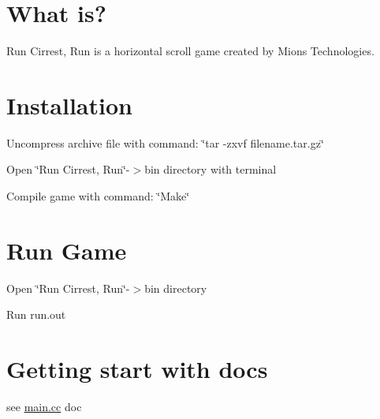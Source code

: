 \hypertarget{index_intro_sec}{}\section{What is?}\label{index_intro_sec}
Run Cirrest, Run is a horizontal scroll game created by Mions Technologies.\hypertarget{index_install_sec}{}\section{Installation}\label{index_install_sec}

\begin{DoxyEnumerate}
\item Uncompress archive file with command\-: \char`\"{}tar -\/zxvf filename.\-tar.\-gz\char`\"{}
\item Open \char`\"{}\-Run Cirrest, Run\char`\"{}-\/$>$bin directory with terminal
\item Compile game with command\-: \char`\"{}\-Make\char`\"{} 
\end{DoxyEnumerate}\hypertarget{index_run_sec}{}\section{Run Game}\label{index_run_sec}

\begin{DoxyEnumerate}
\item Open \char`\"{}\-Run Cirrest, Run\char`\"{}-\/$>$bin directory
\item Run run.\-out 
\end{DoxyEnumerate}\hypertarget{index_doc_sec}{}\section{Getting start with docs}\label{index_doc_sec}
see \hyperlink{main_8cc}{main.\-cc} doc 